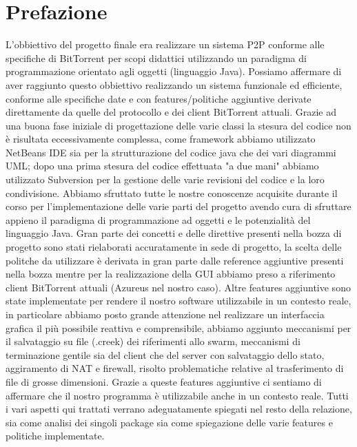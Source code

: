 \section{Prefazione}

L'obbiettivo del progetto finale era realizzare un sistema P2P conforme alle specifiche di BitTorrent per scopi didattici utilizzando un paradigma di programmazione orientato agli oggetti (linguaggio Java).
Possiamo affermare di aver raggiunto questo obbiettivo realizzando un sistema funzionale ed efficiente, conforme alle specifiche date e con features/politiche aggiuntive derivate direttamente da quelle del protocollo e dei client BitTorrent attuali.
Grazie ad una buona fase iniziale di progettazione delle varie classi la stesura del codice non \`e risultata eccessivamente complessa, come framework abbiamo utilizzato NetBeans IDE sia per la strutturazione del codice java che dei vari diagrammi UML; dopo una prima stesura del codice effettuata "a due mani" abbiamo utilizzato Subversion per la gestione delle varie revisioni del codice e la loro condivisione. Abbiamo sfruttato tutte le nostre conoscenze acquisite durante il corso per l'implementazione delle varie parti del progetto avendo cura di sfruttare appieno il paradigma di programmazione ad oggetti e le potenzialit\`a del linguaggio Java.
\linebreak
Gran parte dei concetti e delle direttive presenti nella bozza di progetto sono stati rielaborati accuratamente in sede di progetto, la scelta delle politche da utilizzare \`e derivata in gran parte dalle reference aggiuntive presenti nella bozza mentre per la realizzazione della GUI abbiamo preso a riferimento client BitTorrent attuali (Azureus nel nostro caso). 
\linebreak
Altre features aggiuntive sono state implementate per rendere il nostro software utilizzabile in un contesto reale, in particolare abbiamo posto grande attenzione nel realizzare un interfaccia grafica il pi\`u possibile reattiva e comprensibile, abbiamo aggiunto meccanismi per il salvataggio su file (.creek) dei riferimenti allo swarm, meccanismi di terminazione gentile sia del client che del server con salvataggio dello stato, aggiramento di NAT e firewall, risolto problematiche relative al trasferimento di file di grosse dimensioni.
Grazie a queste features aggiuntive ci sentiamo di affermare che il nostro programma \`e utilizzabile anche in un contesto reale.
\linebreak
Tutti i vari aspetti qui trattati verrano adeguatamente spiegati nel resto della relazione, sia come analisi dei singoli package sia come spiegazione delle varie features e politiche implementate.